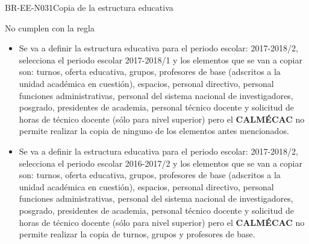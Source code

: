 \begin{BusinessRule}{BR-EE-N031}{Copia de la estructura educativa}
\begin{itemize}
	\end{itemize}
	 No cumplen con la regla
	\begin{itemize}
		\item Se va a definir la estructura educativa para el periodo escolar: 2017-2018/2, selecciona el periodo escolar 2017-2018/1 y los elementos que se van a copiar son: turnos, oferta educativa, grupos, profesores de base (adscritos a la unidad académica en cuestión), espacios, personal directivo, personal funciones administrativas, personal del sistema nacional de investigadores, posgrado, presidentes de academia, personal técnico docente y solicitud de horas de técnico docente (sólo para nivel superior) pero el \textbf{CALMÉCAC} no permite realizar la copia de ninguno de los elementos antes mencionados.
		\item Se va a definir la estructura educativa para el periodo escolar: 2017-2018/2, selecciona el periodo escolar 2016-2017/2 y los elementos que se van a copiar son: turnos, oferta educativa, grupos, profesores de base (adscritos a la unidad académica en cuestión), espacios, personal directivo, personal funciones administrativas, personal del sistema nacional de investigadores, posgrado, presidentes de academia, personal técnico docente y solicitud de horas de técnico docente (sólo para nivel superior) pero el \textbf{CALMÉCAC} no permite realizar la copia de turnos, grupos y profesores de base.
	\end{itemize}
\end{BusinessRule}


